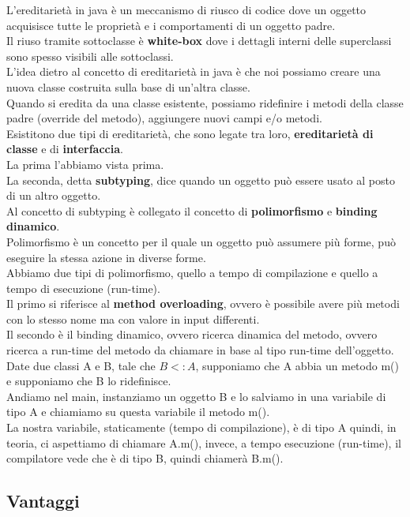 \documentclass{article}
\begin{document}
L'ereditarietà in java è un meccanismo di riusco di codice dove un oggetto acquisisce tutte le proprietà e i comportamenti di un oggetto padre.\\
Il riuso tramite sottoclasse è \textbf{white-box} dove i dettagli interni delle superclassi sono spesso visibili alle sottoclassi.\\
L'idea dietro al concetto di ereditarietà in java è che noi possiamo creare una nuova classe costruita sulla base di un'altra classe.\\
Quando si eredita da una classe esistente, possiamo ridefinire i metodi della classe padre (override del metodo), aggiungere nuovi campi e/o metodi.\\
Esistitono due tipi di ereditarietà, che sono legate tra loro, \textbf{ereditarietà di classe} e di \textbf{interfaccia}.\\
La prima l'abbiamo vista prima.\\
La seconda, detta \textbf{subtyping}, dice quando un oggetto può essere usato al posto di un altro oggetto.\\
Al concetto di subtyping è collegato il concetto di \textbf{polimorfismo} e \textbf{binding dinamico}.\\
Polimorfismo è un concetto per il quale un oggetto può assumere più forme, può eseguire la stessa azione in diverse forme.\\
Abbiamo due tipi di polimorfismo, quello a tempo di compilazione e quello a tempo di esecuzione (run-time).\\
Il primo si riferisce al \textbf{method overloading}, ovvero è possibile avere più metodi con lo stesso nome ma con valore in input differenti.\\
Il secondo è il binding dinamico, ovvero ricerca dinamica del metodo, ovvero ricerca a run-time del metodo da chiamare in base al tipo run-time dell’oggetto.\\
Date due classi A e B, tale che $B<:A$, supponiamo che A abbia un metodo m() e supponiamo che B lo ridefinisce.\\
Andiamo nel main, instanziamo un oggetto B e lo salviamo in una variabile di tipo A e chiamiamo su questa variabile il metodo m().\\
La nostra variabile, staticamente (tempo di compilazione), è di tipo A quindi, in teoria, ci aspettiamo di chiamare A.m(), invece, a tempo esecuzione (run-time), il compilatore vede che è di tipo B, quindi chiamerà B.m().\\

\subsection*{Vantaggi}
\end{document}
